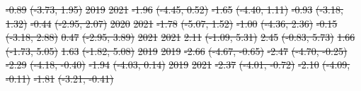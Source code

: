 \documentclass[
  letterpaper,
  DIV=11,
  numbers=noendperiod]{scrartcl}
\providecommand{\DIFdel}[1]{{\protect\color{red}\sout{#1}}}                      %
\providecommand{\DIFdelFL}[1]{\DIFdel{#1}} %
\begin{document}
\DIFdelFL{-0.89 }%
\DIFdelFL{(-3.73, 1.95)}%
\DIFdelFL{\hspace{1em}2019 }%
\DIFdelFL{2021 }%
\DIFdelFL{-1.96 }%
\DIFdelFL{(-4.45, 0.52) }%
\DIFdelFL{-1.65 }%
\DIFdelFL{(-4.40, 1.11) }%
\DIFdelFL{-0.93 }%
\DIFdelFL{(-3.18, 1.32) }%
\DIFdelFL{-0.44 }%
\DIFdelFL{(-2.95, 2.07)}%
\DIFdelFL{\hspace{1em}2020 }%
\DIFdelFL{2021 }%
\DIFdelFL{-1.78 }%
\DIFdelFL{(-5.07, 1.52) }%
\DIFdelFL{-1.00 }%
\DIFdelFL{(-4.36, 2.36) }%
\DIFdelFL{-0.15 }%
\DIFdelFL{(-3.18, 2.88) }%
\DIFdelFL{0.47 }%
\DIFdelFL{(-2.95, 3.89)}%
\DIFdelFL{\hspace{1em}2021 }%
\DIFdelFL{2021 }%
\DIFdelFL{2.11 }%
\DIFdelFL{(-1.09, 5.31) }%
\DIFdelFL{2.45 }%
\DIFdelFL{(-0.83, 5.73) }%
\DIFdelFL{1.66 }%
\DIFdelFL{(-1.73, 5.05) }%
\DIFdelFL{1.63 }%
\DIFdelFL{(-1.82, 5.08)}%
\DIFdelFL{\hspace{1em}2019 }%
\DIFdelFL{2019 }%
\DIFdelFL{-2.66 }%
\DIFdelFL{(-4.67, -0.65) }%
\DIFdelFL{-2.47 }%
\DIFdelFL{(-4.70, -0.25) }%
\DIFdelFL{-2.29 }%
\DIFdelFL{(-4.18, -0.40) }%
\DIFdelFL{-1.94 }%
\DIFdelFL{(-4.03, 0.14)}%
\DIFdelFL{\hspace{1em}2019 }%
\DIFdelFL{2021 }%
\DIFdelFL{-2.37 }%
\DIFdelFL{(-4.01, -0.72) }%
\DIFdelFL{-2.10 }%
\DIFdelFL{(-4.09, -0.11) }%
\DIFdelFL{-1.81 }%
\DIFdelFL{(-3.21, -0.41) }%
\end{document}
